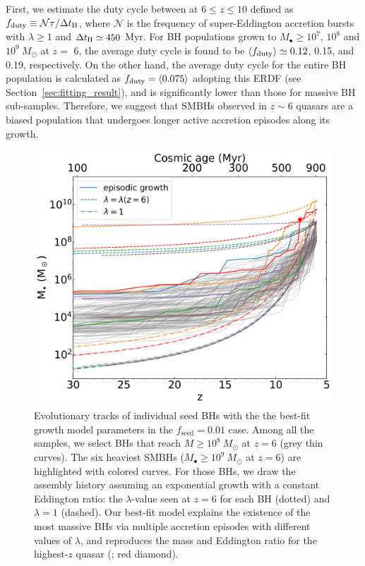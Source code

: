 \documentclass[twocolumn, twocolappendix]{aastex63}
\newcommand{\Msun}{M_\odot}
\newcommand{\tlife}{\tau}
\newcommand{\fseed}{f_\mathrm{seed}}
\begin{document}
\begin{CJK*}{UTF8}{gbsn}
First, we estimate the duty cycle between at $6\leq z\leq 10$ defined as $f_{\rm duty} \equiv \mathcal{N}\tlife/\Delta t_{\rm H}$, 
where $\mathcal{N}$ is the frequency of super-Eddington accretion bursts with $\lambda \geq 1$ and $\Delta t_{\rm H}\simeq 450$ Myr.
For BH populations grown to $M_\bullet \geq10^7$, $10^8$ and $10^9~\Msun$ at $z=$ 6,
the average duty cycle is found to be $\langle f_{\rm duty}\rangle \simeq 0.12$, 0.15, and 0.19, respectively.
On the other hand, the average duty cycle for the entire BH population is calculated as $f_{\rm duty}= \langle 0.075\rangle $
adopting this ERDF (see Section~\ref{sec:fitting_result}), and is significantly lower than those for massive BH sub-samples.
Therefore, we suggest that SMBHs observed in $z\sim 6$ quasars are a biased population
that undergoes longer active accretion episodes along its growth.


\begin{figure}
\centering
\includegraphics[width=125mm]{Mevol.png}
\caption{
Evolutionary tracks of individual seed BHs with the the best-fit growth model parameters in the $\fseed=0.01$ case.
Among all the samples, we select BHs that reach $M\geq 10^8~\Msun$ at $z=6$ (grey thin curves). 
The six heaviest SMBHs ($M_\bullet \geq 10^9~\Msun$ at $z=6$) are highlighted with colored curves. 
For those BHs, we draw the assembly history assuming an exponential growth with a constant Eddington ratio: 
the $\lambda$-value seen at $z=6$ for each BH (dotted) and $\lambda =1$ (dashed).
Our best-fit model explains the existence of the most massive BHs via multiple accretion episodes with different values of $\lambda$,
and reproduces the mass and Eddington ratio for the highest-$z$ quasar (\citealt{2021ApJ...907L...1W}; red diamond).
}
\label{fig:Mevol}
\vspace{5mm}
\end{figure}
%
%



\end{CJK*}
\end{document}

